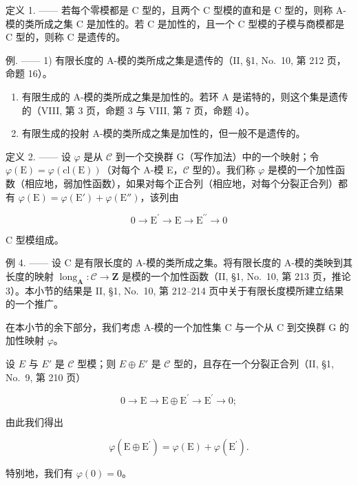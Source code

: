 定义 1. —— 若每个零模都是 C 型的，且两个 C 型模的直和是 C 型的，则称 A-模的类所成之集 C 是加性的。若 C 是加性的，且一个 C 型模的子模与商模都是 C 型的，则称 C 是遗传的。

例. —— 1) 有限长度的 A-模的类所成之集是遗传的（II, §1, No.~10, 第 212 页，命题 16）。

\begin{enumerate}
\def\labelenumi{\arabic{enumi})}
\setcounter{enumi}{1}
\item
  有限生成的 A-模的类所成之集是加性的。若环 A 是诺特的，则这个集是遗传的（VIII, 第 3 页，命题 3 与 VIII, 第 7 页，命题 4）。
\item
  有限生成的投射 A-模的类所成之集是加性的，但一般不是遗传的。
\end{enumerate}

定义 2. —— 设 \(\varphi\) 是从 \(\mathcal{C}\) 到一个交换群 G（写作加法）中的一个映射；令 \(\varphi(\mathrm{E}) = \varphi(\mathrm{cl}(\mathrm{E}))\)（对每个 A-模 E，\(\mathcal{C}\) 型的）。我们称 \(\varphi\) 是模的一个加性函数（相应地，弱加性函数），如果对每个正合列（相应地，对每个分裂正合列）都有 \(\varphi(\mathrm{E}) = \varphi(\mathrm{E}') + \varphi(\mathrm{E}'')\)，该列由

\[
0 \longrightarrow \mathrm{E} ^ {\prime} \longrightarrow \mathrm{E} \longrightarrow \mathrm{E} ^ {\prime \prime} \longrightarrow 0
\]

C 型模组成。

例 4. —— 设 C 是有限长度的 A-模的类所成之集。将有限长度的 A-模的类映到其长度的映射 \(\operatorname{long}_{\mathbf{A}} : \mathcal{C} \to \mathbf{Z}\) 是模的一个加性函数（II, §1, No.~10, 第 213 页，推论 3）。本小节的结果是 II, §1, No.~10, 第 212--214 页中关于有限长度模所建立结果的一个推广。

在本小节的余下部分，我们考虑 A-模的一个加性集 C 与一个从 C 到交换群 G 的加性映射 \(\varphi\)。

设 \(E\) 与 \(E'\) 是 \(\mathcal{C}\) 型模；则 \(E \oplus E'\) 是 \(\mathcal{C}\) 型的，且存在一个分裂正合列（II, §1, No.~9, 第 210 页）

\[
0 \longrightarrow \mathrm{E} \longrightarrow \mathrm{E} \oplus \mathrm{E} ^ {\prime} \longrightarrow \mathrm{E} ^ {\prime} \longrightarrow 0;
\]

由此我们得出

\[
\varphi (\mathrm{E} \oplus \mathrm{E} ^ {\prime}) = \varphi (\mathrm{E}) + \varphi (\mathrm{E} ^ {\prime}).\tag{1}
\]

特别地，我们有 \(\varphi(0) = 0\)。

